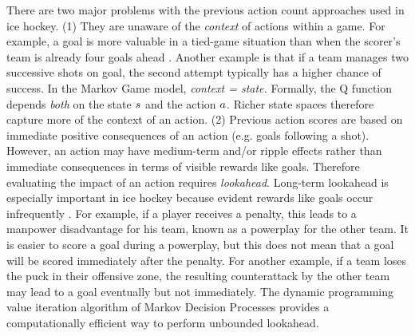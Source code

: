 \documentclass[]{article}
\begin{document}
There are two major problems with the previous action count approaches used in ice hockey. (1) They are unaware of the {\em context} of actions within a game. For example, a goal is more valuable in a tied-game situation than when the scorer's team is already four goals ahead \citep{Pettigrew2015}. Another example is that if a team manages two successive shots on goal, the second attempt typically has a higher chance of success. In the Markov Game model, \emph{context  = state.}
Formally, the Q function depends {\em both} on the state $s$ and the action $a$. Richer state spaces therefore capture more of the context of an action. (2) Previous action scores are based on immediate positive consequences of an action (e.g. goals following a shot). However, an action may have medium-term and/or ripple effects rather than immediate consequences in terms of visible rewards like goals. Therefore evaluating the impact of an action requires {\em lookahead}.  Long-term lookahead is especially important in ice hockey because evident rewards like goals occur infrequently \citep{Lock2009}.
For example, if a player receives a penalty, this leads to a manpower disadvantage for his team, known as a powerplay for the other team.
It is easier to score a goal during a powerplay, but this does not mean that a goal will be scored immediately after the penalty. For another example, if a team loses the puck in their offensive zone, the resulting counterattack by the other team may lead to a goal eventually but not immediately. The dynamic programming value iteration algorithm of Markov Decision Processes provides a computationally efficient way to perform unbounded lookahead.


\end{document}
